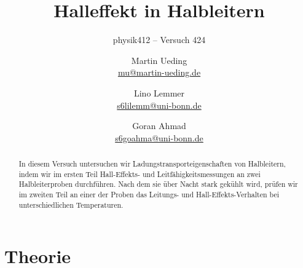 


\usepackage[section]{placeins}
\usepackage{booktabs}
\usepackage{pdflscape}
\usepackage{tikz}
\usetikzlibrary{arrows}

\newcommand\versuchsnummer{424}
\DeclareMathOperator\std{std}

\newcommand\erklaerungFehlerNotation{%
    In dieser Notation bedeutet \num{1.234 +- 0.005}, dass der Wert
    $\num{1.234} \pm \num{0.005}$ ist. Die Ziffern in Klammern sind die
    Fehlerangabe. Um den Fehler zu erhalten, wird diese von rechts über die
    Zahl gelegt, alle anderen Stellen werden auf 0 gesetzt.
}

\ihead{physik412 – Versuch \versuchsnummer}

\subject{Praktikumsprotokoll}
\title{Halleffekt in Halbleitern}
\subtitle{physik412 – Versuch \versuchsnummer}
\author{
    Martin Ueding \\
    \small{\href{mailto:mu@martin-ueding.de}{mu@martin-ueding.de}}
    \and
    Lino Lemmer \\
    \small{\href{mailto:s6lilemm@uni-bonn.de}{s6lilemm@uni-bonn.de}}
    \and
    Goran Ahmad \\
    \small{\href{mailto:s6goahma@uni-bonn.de}{s6goahma@uni-bonn.de}}
}
\publishers{Tutor: Christian Hammann}

\setcounter{secnumdepth}{4}
\setcounter{tocdepth}{3}



\maketitle

\begin{abstract}
    In diesem Versuch untersuchen wir Ladungstransporteigenschaften von
    Halbleitern, indem wir im ersten Teil Hall-Effekts- und
    Leitfähigkeitsmessungen an zwei Halbleiterproben durchführen. Nach dem sie
    über Nacht stark gekühlt wird, prüfen wir im zweiten Teil an einer der
    Proben das Leitungs- und Hall-Effekts-Verhalten bei unterschiedlichen
    Temperaturen.
\end{abstract}

\tableofcontents

\newcommand\probeA{InAs~HF-540}
\newcommand\probeB{InAs~HF-301-040}

\chapter{Theorie}

